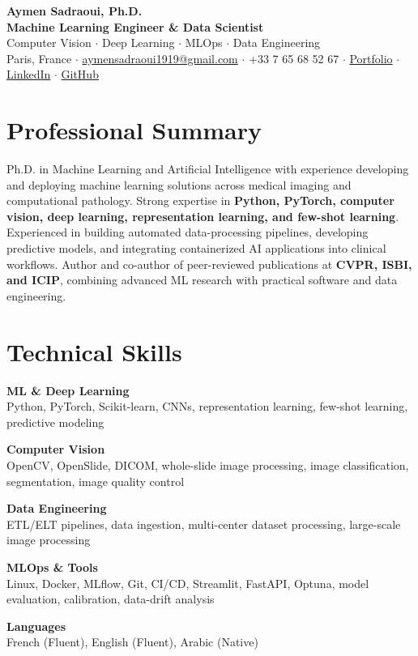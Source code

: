 \documentclass[10pt,a4paper]{article}
\newcommand{\skillItem}[2]{\textbf{#1}\\#2\par\vspace{1pt}}
\begin{document}
\begin{center}
  {\Huge \textbf{\color{primary}Aymen Sadraoui, Ph.D.}}\\[3pt]
  {\large \textbf{Machine Learning Engineer \& Data Scientist}}\\[2pt]
  {\small Computer Vision $\cdot$ Deep Learning $\cdot$ MLOps $\cdot$ Data Engineering}\\[4pt]
  \small
  Paris, France $\cdot$
  \href{mailto:aymensadraoui1919@gmail.com}{aymensadraoui1919@gmail.com} $\cdot$
  +33 7 65 68 52 67 $\cdot$
  \href{https://aymensadraoui.github.io/}{Portfolio} $\cdot$
  \href{https://www.linkedin.com/in/aymen-sadraoui-ph-d-abb571288/}{LinkedIn} $\cdot$
  \href{https://github.com/aymenSadraoui}{GitHub}
\end{center}
\vspace{-3pt}

\section*{Professional Summary}
Ph.D. in Machine Learning and Artificial Intelligence with experience developing and deploying machine learning solutions across medical imaging and computational pathology. Strong expertise in \textbf{Python, PyTorch, computer vision, deep learning, representation learning, and few-shot learning}. Experienced in building automated data-processing pipelines, developing predictive models, and integrating containerized AI applications into clinical workflows. Author and co-author of peer-reviewed publications at \textbf{CVPR, ISBI, and ICIP}, combining advanced ML research with practical software and data engineering.

\section*{Technical Skills}
\skillItem{ML \& Deep Learning}{Python, PyTorch, Scikit-learn, CNNs, representation learning, few-shot learning, predictive modeling}
\skillItem{Computer Vision}{OpenCV, OpenSlide, DICOM, whole-slide image processing, image classification, segmentation, image quality control}
\skillItem{Data Engineering}{ETL/ELT pipelines, data ingestion, multi-center dataset processing, large-scale image processing}
\skillItem{MLOps \& Tools}{Linux, Docker, MLflow, Git, CI/CD, Streamlit, FastAPI, Optuna, model evaluation, calibration, data-drift analysis}
\skillItem{Languages}{French (Fluent), English (Fluent), Arabic (Native)}
\end{document}
